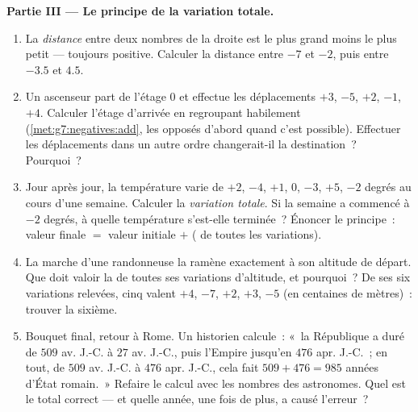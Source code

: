 \begin{problem}
\medskip
\noindent\textbf{Partie III --- Le principe de la variation totale.}
\begin{enumerate}[resume]
  \item La \emph{distance} entre deux nombres de la droite est le
        plus grand moins le plus petit --- toujours positive.
        Calculer la distance entre $-7$ et $-2$, puis entre $-3.5$
        et $4.5$.
  \item Un ascenseur part de l'étage $0$ et effectue les
        déplacements $+3$, $-5$, $+2$, $-1$, $+4$. Calculer l'étage
        d'arrivée en regroupant habilement
        (\cref{met:g7:negatives:add}, les opposés d'abord quand
        c'est possible). Effectuer les déplacements dans un autre
        ordre changerait-il la destination~? Pourquoi~?
  \item Jour après jour, la température varie de $+2$, $-4$, $+1$,
        $0$, $-3$, $+5$, $-2$ degrés au cours d'une semaine.
        Calculer la \emph{variation totale}. Si la semaine a
        commencé à $-2$ degrés, à quelle température s'est-elle
        terminée~? Énoncer le principe~: valeur finale $=$ valeur
        initiale $+$ ( de toutes les variations).
  \item La marche d'une randonneuse la ramène exactement à son
        altitude de départ. Que doit valoir la  de toutes ses
        variations d'altitude, et pourquoi~? De ses six variations
        relevées, cinq valent $+4$, $-7$, $+2$, $+3$, $-5$ (en
        centaines de mètres)~: trouver la sixième.
  \item Bouquet final, retour à Rome. Un historien calcule~: «~la
        République a duré de $509$ av. J.-C. à $27$ av. J.-C., puis
        l'Empire jusqu'en $476$ apr. J.-C.~; en tout, de $509$
        av. J.-C. à $476$ apr. J.-C., cela fait $509 + 476 = 985$
        années d'État romain.~» Refaire le calcul avec les nombres
        des astronomes. Quel est le total correct --- et quelle
        année, une fois de plus, a causé l'erreur~?
\end{enumerate}
\end{problem}
